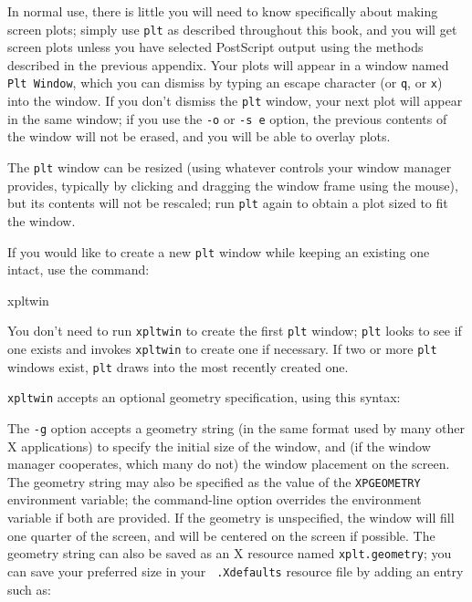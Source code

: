 \documentclass{book}
\begin{document}
%
In normal use, there is little you will need to know specifically
about making screen plots; simply use {\tt plt} as described
throughout this book, and you will get screen plots unless you have
selected PostScript output using the methods described in the previous
appendix.  Your plots will appear in a window named {\tt Plt Window},
which you can dismiss by typing an escape character (or {\tt q}, or
{\tt x}) into the window.  If you don't dismiss the {\tt plt} window,
your next plot will appear in the same window; if you use the {\tt -o}
or {\tt -s e} option, the previous contents of the window will not be
erased, and you will be able to overlay plots.

The {\tt plt} window can be resized (using whatever controls your
window manager provides, typically by clicking and dragging the window
frame using the mouse), but its contents will not be rescaled; run
{\tt plt} again to obtain a plot sized to fit the window.

%
If you would like to create a new {\tt plt} window while keeping an existing
one intact, use the command:

\begin{center}
\begin{boxedverbatim}
xpltwin
\end{boxedverbatim}
\end{center}

You don't need to run {\tt xpltwin} to create the first {\tt plt} window;
{\tt plt} looks to see if one exists and invokes {\tt xpltwin} to create
one if necessary.  If two or more {\tt plt} windows exist, {\tt plt}
draws into the most recently created one.

{\tt xpltwin} accepts an optional geometry specification, using this syntax:

\begin{center}
\end{center}

The {\tt -g} option accepts a geometry string (in the same format used
by many other X applications) to specify the initial size of the
window, and (if the window manager cooperates, which many do not) the
window placement on the screen.  The geometry string may also be
specified as the value of the {\tt XPGEOMETRY} environment variable;
the command-line option overrides the environment variable if both are
provided.  If the geometry is unspecified, the window will fill one
quarter of the screen, and will be centered on the screen if possible.
The geometry string can also be saved as an X resource named
{\tt xplt.geometry};  you can save your preferred size in your {\tt
.Xdefaults} resource file by adding an entry such as:
\end{document}
